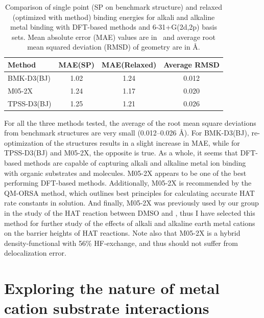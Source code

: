\begin{table}
  \caption[Comparison of single point and relaxed binding energies for alkali and alkaline metal binding with DFT-based methods.]{Comparison of single point (SP on benchmark structure) and relaxed (optimized with method) binding energies for alkali and alkaline metal binding with DFT-based methods and 6-31+G(2d,2p) basis sets. Mean absolute error (MAE) values are in \kcalmol\ and average root mean squared deviation (RMSD) of geometry are in \AA.}\label{tab:ccsd-metal-opt}
  \begin{tabular}{l c c c}
    Method & MAE(SP) & MAE(Relaxed) & Average RMSD \\
    \hline
    BMK-D3(BJ) & 1.02 & 1.24 & 0.012 \\
    M05-2X & 1.24 & 1.17 & 0.020 \\
    TPSS-D3(BJ) & 1.25 & 1.21 & 0.026 \\
  \end{tabular}
\end{table}

For all the three methods tested, the average of the root mean square deviations from benchmark structures are very small (0.012--0.026 \AA). For BMK-D3(BJ), re-optimization of the structures results in a slight increase in MAE, while for TPSS-D3(BJ) and M05-2X, the opposite is true. As a whole, it seems that DFT-based methods are capable of capturing alkali and alkaline metal ion binding with organic substrates and molecules. M05-2X appears to be one of the best performing DFT-based methods. Additionally, M05-2X is recommended by the QM-ORSA\cite{Galano2013} method, which outlines best principles for calculating accurate HAT rate constants in solution. And finally, M05-2X was previously used by our group in the study of the HAT reaction between DMSO and \bno,\cite{vanSanten2016} thus I have selected this method for further study of the effects of alkali and alkaline earth metal cations on the barrier heights of HAT reactions. Note also that M05-2X is a hybrid density-functional with 56\% HF-exchange, and thus should not suffer from delocalization error.

\section{Exploring the nature of metal cation substrate interactions}


